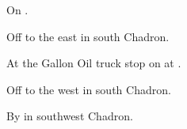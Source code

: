 
\begin{LocationList}

On  .

Off  to the east in south Chadron.

At the Gallon Oil truck stop on  at .

\Location{\TruckService \Service}
Off  to the west in south Chadron.

By   in southwest Chadron.

\end{LocationList}
